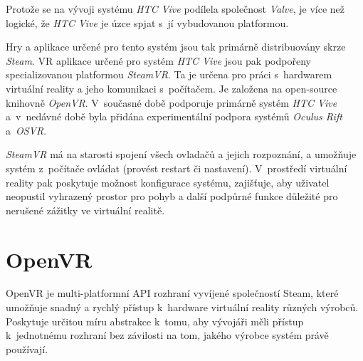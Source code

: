 Protože se na vývoji systému \emph{HTC Vive} podílela společnost
\emph{Valve}, je více než logické, že \emph{HTC Vive} je úzce spjat
s~jí vybudovanou platformou.

Hry a aplikace určené pro tento systém jsou tak primárně distribuovány skrze \emph{Steam}. VR aplikace určené pro systém \emph{HTC Vive}
jsou pak podpořeny specializovanou platformou \emph{SteamVR}. Ta je
určena pro práci s~hardwarem virtuální reality a jeho komunikaci
s~počítačem. Je založena na open-source knihovně \emph{OpenVR}. V~současné
době podporuje primárně systém \emph{HTC Vive} a~v~nedávné době byla
přidána experimentální podpora systémů \emph{Oculus Rift} a~\emph{OSVR}. \autocite{steamvrsupports}

\emph{SteamVR} má na starosti spojení všech ovladačů a jejich
rozpoznání, a umožňuje systém z~počítače ovládat (provést restart či
nastavení). V~prostředí virtuální reality pak poskytuje možnost
konfigurace systému, zajišťuje, aby uživatel neopustil vyhrazený prostor
pro pohyb a další podpůrné funkce důležité pro nerušené zážitky ve
virtuální realitě.

\section{OpenVR}\label{openvr}

OpenVR je multi-platformní API rozhraní vyvíjené společností Steam,
které umožňuje snadný a rychlý přístup k~hardware virtuální reality
různých výrobců. Poskytuje určitou míru abstrakce k~tomu, aby vývojáři
měli přístup k~jednotnému rozhraní bez závilosti na tom, jakého výrobce
systém právě používají.
